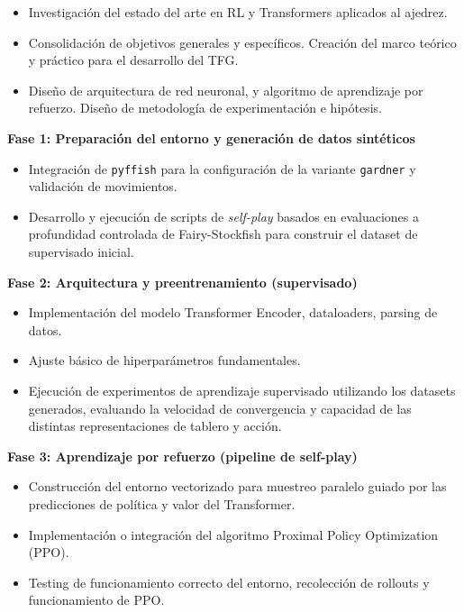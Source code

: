 \documentclass[12pt, a4paper]{article}
\begin{document}
\begin{itemize}
    \item Investigación del estado del arte en RL y Transformers aplicados al ajedrez.
    \item Consolidación de objetivos generales y específicos. Creación del marco teórico y práctico para el desarrollo del TFG.
    \item Diseño de arquitectura de red neuronal, y algoritmo de aprendizaje por refuerzo. Diseño de metodología de experimentación e hipótesis. 
\end{itemize}

\textbf{Fase 1: Preparación del entorno y generación de datos sintéticos}

\begin{itemize}
    \item Integración de \texttt{pyffish} para la configuración de la variante \texttt{gardner} y validación de movimientos.
    \item Desarrollo y ejecución de scripts de \textit{self-play} basados en evaluaciones a profundidad controlada de Fairy-Stockfish para construir el dataset de supervisado inicial.
\end{itemize}

\textbf{Fase 2: Arquitectura y preentrenamiento (supervisado)}

\begin{itemize}
    \item Implementación del modelo Transformer Encoder, dataloaders, parsing de datos.
    \item Ajuste básico de hiperparámetros fundamentales.
    \item Ejecución de experimentos de aprendizaje supervisado utilizando los datasets generados, evaluando la velocidad de convergencia y capacidad de las distintas representaciones de tablero y acción.
\end{itemize}

\textbf{Fase 3: Aprendizaje por refuerzo (pipeline de self-play)}

\begin{itemize}
    \item Construcción del entorno vectorizado para muestreo paralelo guiado por las predicciones de política y valor del Transformer.
    \item Implementación o integración del algoritmo Proximal Policy Optimization (PPO).
    \item Testing de funcionamiento correcto del entorno, recolección de rollouts y funcionamiento de PPO. 
\end{itemize}
\end{document}
